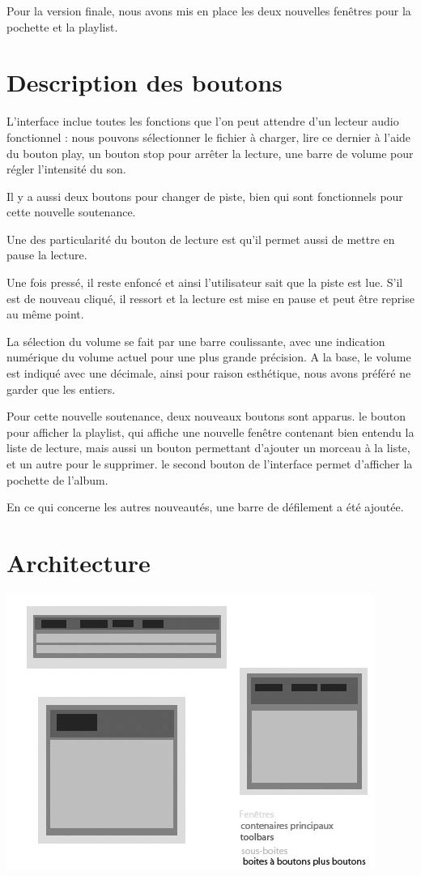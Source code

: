 \documentclass[12pt,a4paper]{report}
\begin{document}
Pour la version finale, nous avons mis en place les deux nouvelles fenêtres pour la pochette et la playlist.

\section{Description des boutons}

L'interface inclue toutes les fonctions que l'on peut attendre d'un lecteur
audio fonctionnel : nous pouvons sélectionner le fichier à charger, lire ce dernier à l'aide du bouton play, un bouton stop pour arrêter la lecture, une barre de volume pour régler l'intensité du son.

Il y a aussi deux boutons pour changer de piste, bien qui sont fonctionnels pour cette nouvelle soutenance.

Une des particularité du bouton de lecture est qu'il permet aussi de mettre
en pause la lecture.

Une fois pressé, il reste enfoncé et ainsi l'utilisateur sait que la piste est lue. S'il est de nouveau cliqué, il ressort et la lecture est mise en pause et peut être reprise au même point.

La sélection du volume se fait par une barre coulissante, avec une indication
numérique du volume actuel pour une plus grande précision. A la base,
le volume est indiqué avec une décimale, ainsi pour raison esthétique, nous
avons préféré ne garder que les entiers.

Pour cette nouvelle soutenance, deux nouveaux boutons sont apparus.  le bouton pour afficher la playlist, qui affiche une nouvelle fenêtre contenant bien entendu la liste de lecture, mais aussi un bouton permettant d'ajouter un morceau à la liste, et un autre pour le supprimer.
le second bouton de l'interface permet d'afficher la pochette de l'album.

En ce qui concerne les autres nouveautés, une barre de défilement a été ajoutée.

\section{Architecture}

\begin{center}
\includegraphics[scale =0.8]{archi.jpg}
\end{center}
\end{document}
